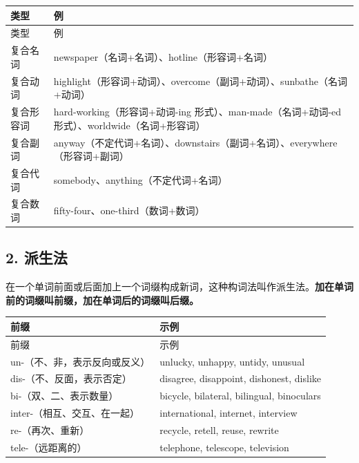 \documentclass[11pt,a4paper]{ctexart}
\begin{document}
{\footnotesize
\begin{longtable}{p{6.70cm}p{6.70cm}}
\hline
类型 & 例 \\
\hline
\endfirsthead
\hline
类型 & 例 \\
\hline
\endhead
\hline
\endfoot
复合名词 & newspaper（名词+名词）、hotline（形容词+名词） \\
复合动词 & highlight（形容词+动词）、overcome（副词+动词）、sunbathe（名词+动词） \\
复合形容词 & hard-working（形容词+动词-ing 形式）、man-made（名词+动词-ed 形式）、worldwide（名词+形容词） \\
复合副词 & anyway（不定代词+名词）、downstairs（副词+名词）、everywhere（形容词+副词） \\
复合代词 & somebody、anything（不定代词+名词） \\
复合数词 & fifty-four、one-third（数词+数词） \\
\end{longtable}
}

\subsection*{2. 派生法}

在一个单词前面或后面加上一个词缀构成新词，这种构词法叫作派生法。\textbf{加在单词前的词缀叫前缀，加在单词后的词缀叫后缀。}

{\footnotesize
\begin{longtable}{p{6.70cm}p{6.70cm}}
\hline
前缀 & 示例 \\
\hline
\endfirsthead
\hline
前缀 & 示例 \\
\hline
\endhead
\hline
\endfoot
un-（不、非，表示反向或反义） & unlucky, unhappy, untidy, unusual \\
dis-（不、反面，表示否定） & disagree, disappoint, dishonest, dislike \\
bi-（双、二、表示数量） & bicycle, bilateral, bilingual, binoculars \\
inter-（相互、交互、在一起） & international, internet, interview \\
re-（再次、重新） & recycle, retell, reuse, rewrite \\
tele-（远距离的） & telephone, telescope, television \\
\end{longtable}
}
\end{document}
